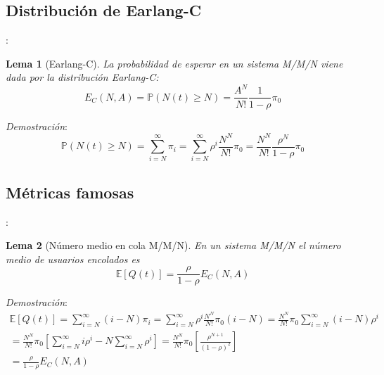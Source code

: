 \documentclass[xcolor={x11names}]{beamer}
\newtheorem{lema}{Lema}[section]
\begin{document}
\subsection{Distribución de Earlang-C}
\begin{frame}{\secname: \subsecname}
    \begin{lema}[Earlang-C]
        La probabilidad de esperar en un
        sistema M/M/N viene dada por
        la distribución Earlang-C:
        \begin{equation}
            E_C(N,A)=\mathbb{P}(N(t)\geq N)
            = \frac{A^N}{N!}\frac{1}{1-\rho}\pi_0
        \end{equation}
    \end{lema}
    \begin{figure}
        \resizebox{!}{.2\textwidth}{%
            
        }
    \end{figure}
    \vfill
    \textit{Demostración}:
        \begin{equation}
            \mathbb{P}(N(t)\geq N)=
            \sum_{i=N}^{\infty}\pi_i
            = \sum_{i=N}^{\infty}
            \rho^i \frac{N^N}{N!}\pi_0
            = \frac{N^N}{N!}\frac{\rho^N}{1-\rho}\pi_0
        \end{equation}
\end{frame}




\subsection{Métricas famosas}
\begin{frame}{\secname: \subsecname}
    \begin{lema}[Número medio en cola M/M/N]
        En un sistema M/M/N el número medio
        de usuarios encolados es
        \begin{equation}
            \mathbb{E}[Q(t)]=
            \frac{\rho}{1-\rho}
            E_C(N,A)
        \end{equation}
    \end{lema}
    \vfill
    \textit{Demostración}:
    \begin{multline*}
        \mathbb{E}[Q(t)]=\sum_{i=N}^\infty
        (i-N)\pi_i=
        \sum_{i=N}^\infty \rho^i \frac{N^N}{N!}
        \pi_0(i-N)=
        \frac{N^N}{N!}\pi_0
        \sum_{i=N}^\infty(i-N)\rho^i\\
        = 
        \frac{N^N}{N!}\pi_0
        \left[
            \sum_{i=N}^\infty
            i\rho^i - N\sum_{i=N}^\infty
            \rho^i
        \right]
        = 
        \frac{N^N}{N!}\pi_0
        \left[
            \frac{\rho^{N+1}}{(1-\rho)^2}
        \right]\\
        = \frac{\rho}{1-\rho}E_C(N,A)
    \end{multline*}
\end{frame}
\end{document}
